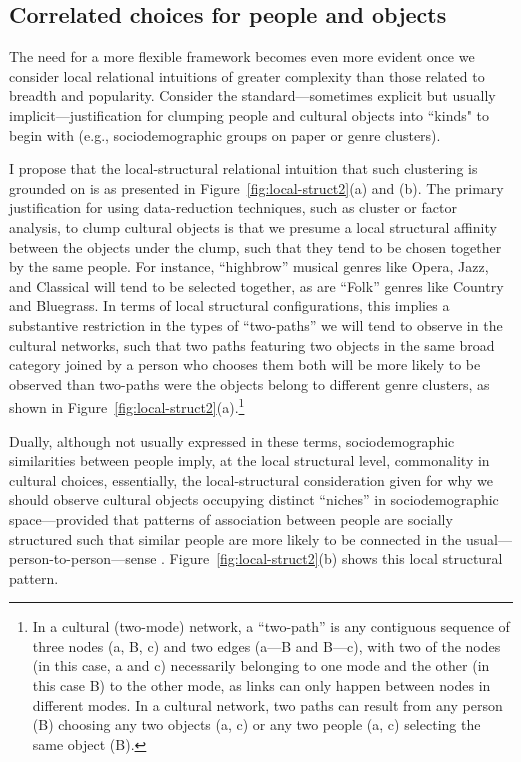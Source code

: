 \documentclass[preprint,12pt,authoryear]{elsarticle}
\begin{document}
\subsection{Correlated choices for people and objects}
The need for a more flexible framework becomes even more evident once we consider local relational intuitions of greater complexity than those related to breadth and popularity. Consider the standard—sometimes explicit but usually implicit—justification for clumping people and cultural objects into ``kinds" to begin with (e.g., sociodemographic groups on paper or genre clusters). 

I propose that the local-structural relational intuition that such clustering is grounded on is as presented in Figure~\ref{fig:local-struct2}(a) and (b). The primary justification for using data-reduction techniques, such as cluster or factor analysis, to clump cultural objects is that we presume a local structural affinity between the objects under the clump, such that they tend to be chosen together by the same people. For instance, ``highbrow'' musical genres like Opera, Jazz, and Classical will tend to be selected together, as are ``Folk'' genres like Country and Bluegrass. In terms of local structural configurations, this implies a substantive restriction in the types of ``two-paths'' we will tend to observe in the cultural networks, such that two paths featuring two objects in the same broad category joined by a person who chooses them both will be more likely to be observed than two-paths were the objects belong to different genre clusters, as shown in Figure~\ref{fig:local-struct2}(a).\footnote{In a cultural (two-mode) network, a ``two-path'' is any contiguous sequence of three nodes (a, B, c) and two edges (a---B and B---c), with two of the nodes (in this case, a and c) necessarily belonging to one mode and the other (in this case B) to the other mode, as links can only happen between nodes in different modes. In a cultural network, two paths can result from any person (B) choosing any two objects (a, c) or any two people (a, c) selecting the same object (B).} 

Dually, although not usually expressed in these terms, sociodemographic similarities between people imply, at the local structural level, commonality in cultural choices, essentially, the local-structural consideration given for why we should observe cultural objects occupying distinct ``niches'' in sociodemographic space---provided that patterns of association between people are socially structured such that similar people are more likely to be connected in the usual---person-to-person---sense \citep{mark2003culture, dellaposta2015liberals}. Figure~\ref{fig:local-struct2}(b) shows this local structural pattern.
\end{document}
